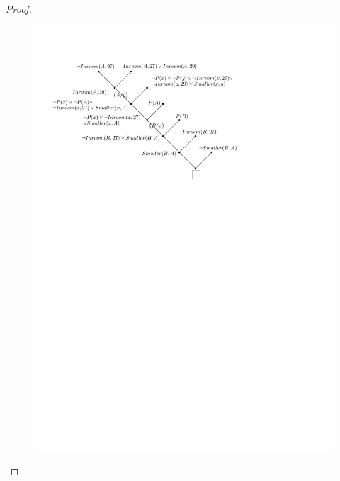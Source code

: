 \begin{example}
\begin{proof}
\begin{figure}[htbp]
            \includegraphics{image/定理证明例子.pdf}
        \end{figure}
    \end{proof}
\end{example}

